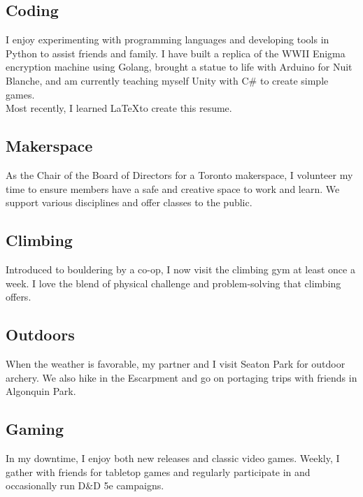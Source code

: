 \documentclass[
	10pt, %
]{FreemanCV}
\begin{document}
\begin{paracol}{2}
\subsection{Coding}
I enjoy experimenting with programming languages and developing tools in Python to assist friends and family. I have built a replica of the WWII Enigma encryption machine using Golang, brought a statue to life with Arduino for Nuit Blanche, and am currently teaching myself Unity with C\# to create simple games.\\Most recently, I learned \LaTeX to create this resume.

\subsection{Makerspace}
As the Chair of the Board of Directors for a Toronto makerspace, I volunteer my time to ensure members have a safe and creative space to work and learn. We support various disciplines and offer classes to the public.

\subsection{Climbing}
Introduced to bouldering by a co-op, I now visit the climbing gym at least once a week. I love the blend of physical challenge and problem-solving that climbing offers.

\subsection{Outdoors}
When the weather is favorable, my partner and I visit Seaton Park for outdoor archery. We also hike in the Escarpment and go on portaging trips with friends in Algonquin Park.

\subsection{Gaming}
In my downtime, I enjoy both new releases and classic video games. Weekly, I gather with friends for tabletop games and regularly participate in and occasionally run D\&D 5e campaigns.


\end{paracol} %

\end{document}
